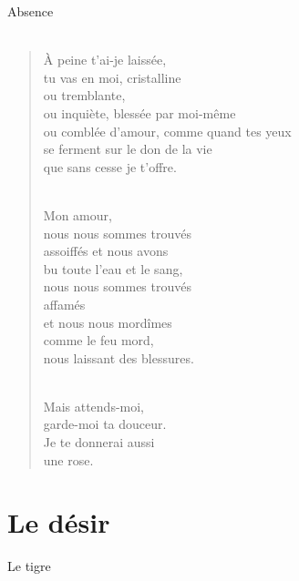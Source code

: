 \documentclass[11pt,a4paper]{book}
\begin{document}
\newpage

{\huge Absence} \\ \\

\begin{verse}
À peine t'ai-je laissée, \\
tu vas en moi, cristalline \\
ou tremblante, \\
ou inquiète, blessée par moi-même \\
ou comblée d'amour, comme quand tes yeux \\
se ferment sur le don de la vie \\
que sans cesse je t'offre. \\ \

Mon amour, \\
nous nous sommes trouvés \\
assoiffés et nous avons \\
bu toute l'eau et le sang, \\
nous nous sommes trouvés \\
affamés \\
et nous nous mordîmes \\
comme le feu mord, \\
nous laissant des blessures. \\ \

Mais attends-moi, \\
garde-moi ta douceur. \\
Je te donnerai aussi \\
une rose.
\end{verse}

\cleardoublepage

\part{Le désir}

\cleardoublepage

{\huge Le tigre} \\ \\
\end{document}

